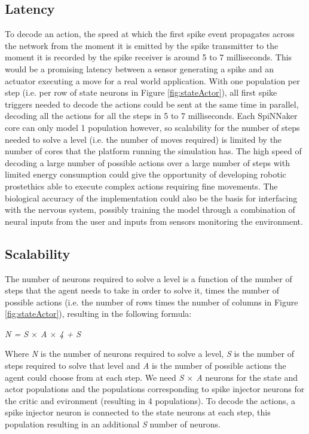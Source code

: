 \documentclass[10pt]{article}
\begin{document}
    \subsection{Latency}

    To decode an action, the speed at which the first spike event propagates across the network from the moment it is emitted by the spike transmitter to the moment it is recorded by the spike receiver is around 5 to 7 milliseconds. This would be a promising latency between a sensor generating a spike and an actuator executing a move for a real world application.  With one population per step (i.e. per row of state neurons in Figure \ref{fig:stateActor}), all first spike triggers needed to decode the actions could be sent at the same time in parallel, decoding all the actions for all the steps in 5 to 7 milliseconds. Each SpiNNaker core can only model 1 population however, so scalability for the number of steps needed to solve a level (i.e. the number of moves required) is limited by the number of cores that the platform running the simulation has. The high speed of decoding a large number of possible actions over a large number of steps with limited energy consumption could give the opportunity of developing robotic prostethics able to execute complex actions requiring fine movements. The biological accuracy of the implementation could also be the basis for interfacing with the nervous system, possibly training the model through a combination of neural inputs from the user and inputs from sensors monitoring the environment.

    \subsection{Scalability}

    The number of neurons required to solve a level is a function of the number of steps that the agent needs to take in order to solve it, times the number of possible actions (i.e. the number of rows times the number of columns in Figure \ref{fig:stateActor}), resulting in the following formula:

    \begin{center}
        \textit{N = S $\times$ A $\times$ 4 + S}
    \end{center}

    Where \textit{N} is the number of neurons required to solve a level, \textit{S} is the number of steps required to solve that level and \textit{A} is the number of possible actions the agent could choose from at each step. We need \textit{S $\times$ A} neurons for the state and actor populations and the populations corresponding to spike injector neurons for the critic and evironment (resulting in 4 populations). To decode the actions, a spike injector neuron is connected to the state neurons at each step, this population resulting in an additional \textit{S} number of neurons.
\end{document}
